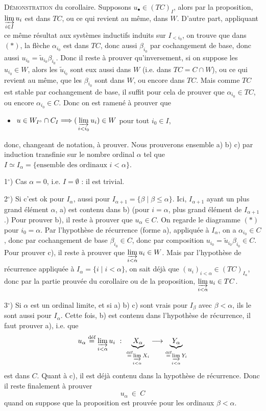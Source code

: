 \documentclass[11pt]{article}
\newcommand{\msp}[1]{\marginpar{\footnotesize [#1]}}
\begin{document}
\textsc{Démonstration} du corollaire. Supposons $u_\bullet \in (TC)_I$, alors par la proposition, $\varinjlim\limits_{i\in I} u_i$ est dans $TC$, ou ce qui revient au même, dans $W$. D'autre part, appliquant ce même résultat aux systèmes inductifs induits sur $I_{<i_0}$, on trouve que dans $(*)$, la flèche $\alpha_{i_0}$ est dans $TC$, donc aussi $\beta_{i_0}$ par cochangement de base, donc aussi $u_{i_0} = \tilde{u}_{i_0}\beta_{i_0}$. Donc il reste à prouver qu'inversement, si on suppose les $u_{i_0} \in W$, alors les $\tilde{u}_{i_0}$ sont eux aussi dans $W$ (i.e. dans $TC = C \cap W$), ou ce qui revient au même, que les $\beta_{i_0}$ sont dans $W$, ou encore dans $TC$. Mais comme $TC$ est stable par cochangement de base, il suffit pour cela de prouver que $\alpha_{i_0} \in TC$, ou encore $\alpha_{i_0} \in C$. Donc on est ramené à prouver que
\begin{itemize}[leftmargin=2.5em]
\item[c)] $u \in W_{I^{\circ}} \cap C_I \Longrightarrow (\,\varinjlim\limits_{i<i_0} u_i) \in W$ pour tout $i_0 \in I$,
\end{itemize}
donc, changeant de notation, à prouver. Nous prouverons ensemble a) b) c) par induction transfinie sur le nombre ordinal $\alpha$ tel que $I \simeq I_\alpha = \{\text{ensemble des ordinaux } i < \alpha\}$.

\msp{page 4}

1$^\circ$) Cas $\alpha = 0$, i.e. $I = \emptyset$ : il est trivial.

2$^\circ$) Si c'est ok pour $I_\alpha$, aussi pour $I_{\alpha+1} = \{\beta \mid \beta \leq \alpha\}$. Ici, $I_{\alpha+1}$ ayant un plus grand élément $\alpha$, a) est contenu dans b) (pour $i = \alpha$, plus grand élément de $I_{\alpha+1}$.) Pour prouver b), il reste à prouver que $u_\alpha \in C$. On regarde le diagramme $(*)$ pour $i_0 = \alpha$. Par l'hypothèse de récurrence (forme a), appliquée à $I_\alpha$, on a $\alpha_{i_0} \in C$, donc par cochangement de base $\beta_{i_0} \in C$, donc par composition $u_{i_0} = \tilde{u}_{i_0}\beta_{i_0} \in C$. Pour prouver c), il reste à prouver que $\varinjlim\limits_{i<\alpha} u_i \in W$. Mais par l'hypothèse de récurrence appliquée à $I_\alpha = \{i \mid i < \alpha\}$, on sait déjà que $(u_i)_{i<\alpha} \in (TC)_{I_\alpha}$, donc par la partie prouvée du corollaire ou de la proposition, $\varinjlim\limits_{i<\alpha} u_i \in TC$.

3$^\circ$) Si $\alpha$ est un ordinal limite, et si a) b) c) sont vrais pour $I_\beta$ avec $\beta < \alpha$, ils le sont aussi pour $I_\alpha$. Cette fois, b) est contenu dans l'hypothèse de
\msp{page 5}
récurrence, il faut prouver a), i.e. que
\[
u_\alpha \overset{\text{déf}}{=} \varinjlim_{i<\alpha} u_i \ :\ \underbrace{X_\alpha}_{\overset{\text{déf}}{=} \varinjlim\limits_{i<\alpha} X_i} \longrightarrow \underbrace{Y_\alpha}_{\overset{\text{déf}}{=} \varinjlim\limits_{i<\alpha} Y_i}
\]
est dans $C$. Quant à c), il est déjà contenu dans la hypothèse de récurrence. Donc il reste finalement à prouver
\[
u_\alpha \ \in \ C
\]
quand on suppose que la proposition est prouvée pour les ordinaux $\beta < \alpha$.
\end{document}
